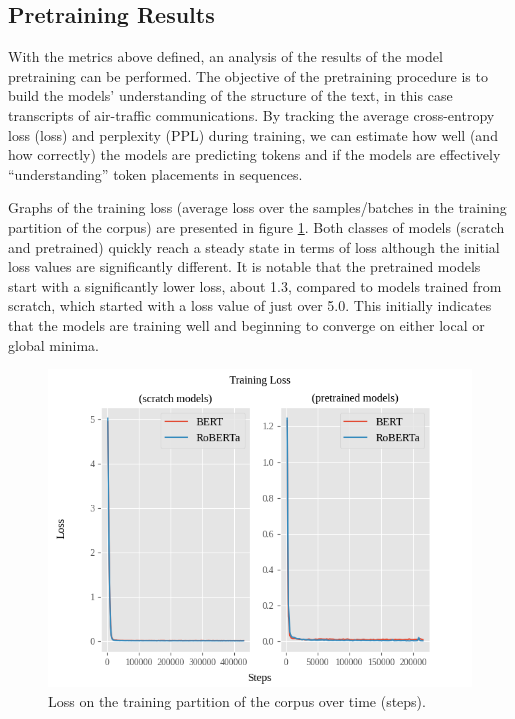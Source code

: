 \documentclass[12pt]{article}
\begin{document}
\subsection{Pretraining Results}\label{sec:pretraining_results}
With the metrics above defined, an analysis of the results of the model pretraining can be performed. The objective of the pretraining procedure is to
build the models' understanding of the structure of the text, in this case transcripts of air-traffic communications. By tracking the average
cross-entropy loss (loss) and perplexity (PPL) during training, we can estimate how well (and how correctly) the models are predicting tokens and if
the models are effectively ``understanding'' token placements in sequences.

Graphs of the training loss (average loss over the samples/batches in the training partition of the corpus) are presented in figure
\ref{fig:training_loss}. Both classes of models (scratch and pretrained) quickly reach a steady state in terms of loss although the initial loss
values are significantly different. It is notable that the pretrained models start with a significantly lower loss, about 1.3, compared to models
trained from scratch, which started with a loss value of just over 5.0. This initially indicates that the models are training well and beginning to
converge on either local or global minima.

\begin{figure}[!t]
    \includegraphics[width=\linewidth]{figures/training_loss.png}
    \caption{Loss on the training partition of the corpus over time (steps).}
    \label{fig:training_loss}
\end{figure}
\end{document}
